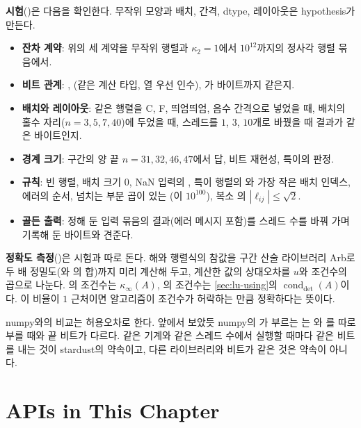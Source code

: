 \textbf{시험}()은 다음을 확인한다. 무작위 모양과 배치, 간격, dtype, 레이아웃은 hypothesis가 만든다.
\begin{itemize}
\item \textbf{잔차 계약}: 위의 세 계약을 무작위 행렬과 $\kappa_2=1$에서 $10^{12}$까지의 정사각 행렬 묶음에서.
\item \textbf{비트 관계}: , (같은 계산 타입, 열 우선 인수), 가 바이트까지 같은지.
\item \textbf{배치와 레이아웃}: 같은 행렬을 C, F, 띄엄띄엄, 음수 간격으로 넣었을 때, 배치의 홀수 자리($n=3,5,7,40$)에 두었을 때, 스레드를 $1$, $3$, $10$개로 바꿨을 때 결과가 같은 바이트인지.
\item \textbf{경계 크기}:  구간의 양 끝 $n=31,32,46,47$에서 답, 비트 재현성, 특이의 판정.
\item \textbf{규칙}: 빈 행렬, 배치 크기 $0$, NaN 입력의 , 특이 행렬의 와 가장 작은 배치 인덱스, 에러의 순서, 넘치는 부분 곱이 있는 (이 $10^{100}$), 복소 의 $|\ell_{ij}|\le\sqrt2$.
\item \textbf{골든 출력}: 정해 둔 입력 묶음의 결과(에러 메시지 포함)를 스레드 수를 바꿔 가며 기록해 둔 바이트와 견준다.
\end{itemize}

\textbf{정확도 측정}()은 시험과 따로 돈다. 해와 행렬식의 참값을 구간 산술 라이브러리 Arb로 두 배 정밀도(와 의 합)까지 미리 계산해 두고, 계산한 값의 상대오차를 $u$와 조건수의 곱으로 나눈다. 의 조건수는 $\kappa_\infty(A)$, 의 조건수는 \cref{sec:lu-using}의 $\operatorname{cond}_{\det}(A)$이다. 이 비율이 $1$ 근처이면 알고리즘이 조건수가 허락하는 만큼 정확하다는 뜻이다.

numpy와의 비교는 허용오차로 한다. 앞에서 보았듯 numpy의 가 부르는 는 와 를 따로 부를 때와 끝 비트가 다르다. 같은 기계와 같은 스레드 수에서 실행할 때마다 같은 비트를 내는 것이 stardust의 약속이고, 다른 라이브러리와 비트가 같은 것은 약속이 아니다.

\section{APIs in This Chapter}
\label{sec:lu-apis}

